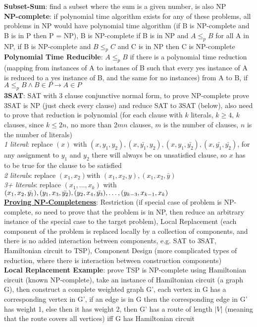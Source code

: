 \documentclass[a4paper]{article}
\begin{document}
\begin{multicols}{2}
        \textbf{Subset-Sum}: find a subset where the sum is a given number, is also NP\\
        \textbf{NP-complete}: if polynomial time algorithm exists for any of these problems, all problems in NP would have polynomial time algorithm (if B is NP-complete and B is in P then P = NP), B is NP-complete if B is in NP and $A \leq_p B$ for all A in NP, if B is NP-complete and $B \leq_p C$ and C is in NP then C is NP-complete\\
        \textbf{Polynomial Time Reducible}: $A \leq_p B$ if there is a polynomial time reduction (mapping from instances of A to instanes of B such that every yes instance of A is reduced to a yes instance of B, and the same for no instances) from A to B, if $A \leq_p B \wedge B \in P \to A \in P$\\
        \textbf{3SAT}: SAT with 3 clause conjunctive normal form, to prove NP-complete prove 3SAT is NP (just check every clause) and reduce SAT to 3SAT (below), also need to prove that reduction is polynomial (for each clause with $k$ literals, $k \geq 4$, $k$ clauses, since $k \leq 2n$, no more than $2mn$ clauses, $m$ is the number of clauses, $n$ is the number of literals)\\
        \textit{1 literal}: replace $(x)$ with $(x, y_1, y_2), (x, \bar{y_1}, y_2), (x, y_1, \bar{y_2}), (x, \bar{y_1}, \bar{y_2})$, for any assignment to $y_1$ and $y_2$ there will always be on unsatisfied clause, so $x$ has to be true for the clause to be satisfied\\
        \textit{2 literals}: replace $(x_1, x_2) $with $(x_1, x_2, y), (x_1, x_2, \bar{y})$\\
        \textit{3+ literals}: replace $(x_1, \ldots, x_k)$ with $(x_1, x_2, \bar{y_1}), (y_1, x_3, \bar{y_2}), (y_2, x_4, \bar{y_3}), \ldots, \\(y_{k-3}, x_{k-1}, x_k)$\\
        \underline{\textbf{Proving NP-Completeness}}: Restriction (if special case of problem is NP-complete, so need to prove that the problem is in NP, then reduce an arbitrary instance of the special case to the target problem), Local Replacement (each component of the problem is replaced locally by a collection of components, and there is no added interaction between components, e.g. SAT to 3SAT, Hamiltonian circuit to TSP), Component Design (more complicated types of reduction, where there is interaction between construction components)\\
        \textbf{Local Replacement Example}: prove TSP is NP-complete using Hamiltonian circuit (known NP-complete), take an instance of Hamiltonian circuit (a graph G), then construct a complete weighted graph G', each vertex in G has a corresponding vertex in G', if an edge is in G then the corresponding edge in G' has weight 1, else then it has weight 2, then G' has a route of length $|V|$ (meaning that the route covers all vertices) iff G has Hamiltonian circuit\\

\end{multicols}
\end{document}
